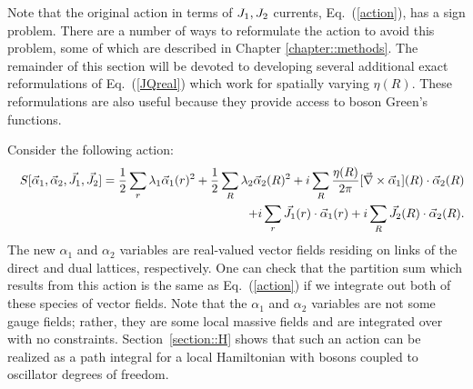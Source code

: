 Note that the original action in terms of $J_1, J_2$ currents, Eq.~(\ref{action}), has a sign problem.  There are a number of ways to reformulate the action to avoid this problem, some of which are described in Chapter \ref{chapter::methods}.   The remainder of this section will be devoted to developing several additional exact reformulations of Eq.~(\ref{JQreal}) which work for spatially varying $\eta(R)$.  These reformulations are also useful because they provide access to boson Green's functions.

Consider the following action:
\begin{eqnarray}
&&S[\vec{\alpha}_1,\vec{\alpha}_2,\vec{J}_1,\vec{J}_2]=\frac{1}{2}\sum_r \lambda_1 \vec{\alpha}_{1}(r)^2 + \frac{1}{2}\sum_R \lambda_2 \vec{\alpha}_{2}(R)^2  \nonumber
 +i\sum_R \frac{\eta(R)}{2\pi} [\vec{\nabla}\times\vec{\alpha}_{1}](R) \cdot \vec{\alpha}_{2}(R)\nonumber\\
&&~~~~~~~~ +i\sum_r \vec{J}_1(r)\cdot\vec{\alpha}_{1}(r)+i\sum_R \vec{J}_2(R)\cdot\vec{\alpha}_{2}(R).
\label{preal}
\end{eqnarray}
The new $\alpha_1$ and $\alpha_2$ variables are real-valued vector fields residing on links of the direct and dual lattices, respectively. One can check that the partition sum which results from this action is the same as Eq.~(\ref{action}) if we integrate out both of these species of vector fields.  Note that the $\alpha_1$ and $\alpha_2$ variables are not some gauge fields; rather, they are some local massive fields and are integrated over with no constraints.  Section~\ref{section::H} shows that such an action can be realized as a path integral for a local Hamiltonian with bosons coupled to oscillator degrees of freedom. 

